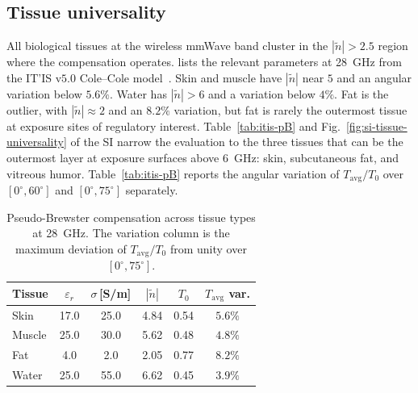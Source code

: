\documentclass[journal,twocolumn,10pt]{IEEEtran}
\theoremstyle{plain}
\theoremstyle{remark}
\newcommand{\Tavg}{T_{\mathrm{avg}}}
\newcommand{\ntilde}{\tilde{n}}
\begin{document}
\subsection{Tissue universality}\label{subsec:pB-tissues}
All biological tissues at the wireless mmWave band cluster in the
$|\ntilde| > 2.5$ region where the compensation operates.
 lists the relevant parameters at 28~GHz from
the IT'IS v$5.0$ Cole--Cole model~\cite{ITISv5,Gabriel1996}. Skin and
muscle have $|\ntilde|$ near $5$ and an angular variation below
$5.6\%$. Water has $|\ntilde| > 6$ and a variation below $4\%$.
Fat is the outlier, with $|\ntilde| \approx 2$ and an $8.2\%$
variation, but fat is rarely the outermost tissue at exposure sites
of regulatory interest. Table~\ref{tab:itis-pB} and
Fig.~\ref{fig:si-tissue-universality} of the SI narrow the
evaluation to the three tissues that can be the outermost layer at
exposure surfaces above $6$~GHz: skin, subcutaneous fat, and
vitreous humor. Table~\ref{tab:itis-pB} reports the angular
variation of $\Tavg/T_0$ over $[0^\circ, 60^\circ]$ and $[0^\circ,
75^\circ]$ separately.

\begin{table}[!t]
\centering
\caption{Pseudo-Brewster compensation across tissue types at
28~GHz. The variation column is the maximum deviation of
$\Tavg/T_0$ from unity over $[0^\circ, 75^\circ]$.}
\label{tab:materials}
\begin{tabular}{lccccc}
\toprule
Tissue & $\varepsilon_r$ & $\sigma$\,[S/m] & $|\ntilde|$ & $T_0$
  & $\Tavg$ var. \\
\midrule
Skin   & 17.0 & 25.0 & 4.84 & 0.54 & $5.6\%$ \\
Muscle & 25.0 & 30.0 & 5.62 & 0.48 & $4.8\%$ \\
Fat    &  4.0 &  2.0 & 2.05 & 0.77 & $8.2\%$ \\
Water  & 25.0 & 55.0 & 6.62 & 0.45 & $3.9\%$ \\
\bottomrule
\end{tabular}
\end{table}
\end{document}
